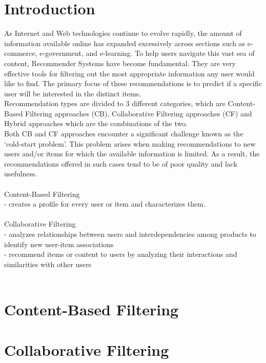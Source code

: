 \documentclass[10pt,oneside,english,a4paper]{article}
\begin{document}
\newpage{} 
\tableofcontents

\newpage{} 
\section{Introduction}
As Internet and Web technologies continue to evolve rapidly, the amount of information available online has expanded excessively across sections such as e-commerce, e-government, and e-learning. To help users navigate this vast sea of content, Recommender Systems have become fundamental. They are very effective tools for filtering out the most appropriate information any user would like to find. The primary focus of these recommendations is to predict if a specific user will be interested in the distinct items.\\
Recommendation types are divided to 3 different categories, which are Content-Based Filtering approaches (CB), Collaborative Filtering approaches (CF) and Hybrid approaches which are the combinations of the two.\\
Both CB and CF approaches encounter a significant challenge known as the ‘cold-start problem’. This problem arises when making recommendations to new users and/or items for which the available information is limited. As a result, the recommendations offered in
such cases tend to be of poor quality and lack usefulness.\cite{Al-Hassan2024a}\\\\
%
%
%
Content-Based Filtering\\
- creates a profile for every user or item and characterizes them.\\\\
%
Collaborative Filtering\\
- analyzes relationships between users  and interdependencies among products to identify new user-item associations\\
- recommend items or content to users by analyzing their interactions and similarities with other users\\\\
\cite{5197422}


\clearpage
\section{Content-Based Filtering}

\section{Collaborative Filtering}
\end{document}

